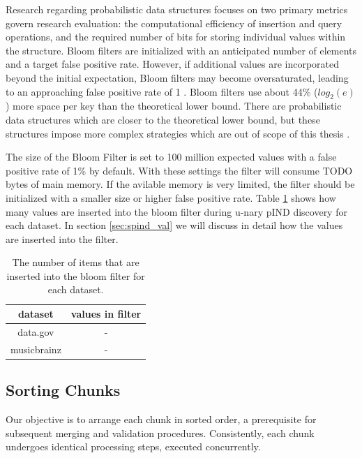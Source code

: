 Research regarding probabilistic data structures focuses on two primary metrics govern research evaluation: the computational efficiency of insertion and query operations, and the required number of bits for storing individual values within the structure\cite{fan2014cuckoo}. Bloom filters are initialized with an anticipated number of elements and a target false positive rate. However, if additional values are incorporated beyond the initial expectation, Bloom filters may become oversaturated, leading to an approaching false positive rate of 1 \cite{tarkoma2011theory}. Bloom filters use about 44\% ($log_2(e)$) more space per key than the theoretical lower bound. There are probabilistic data structures which are closer to the theoretical lower bound, but these structures impose more complex strategies which are out of scope of this thesis \cite{fan2014cuckoo}.

The size of the Bloom Filter is set to 100 million expected values with a false positive rate of 1\% by default. With these settings the filter will consume TODO bytes of main memory. If the avilable memory is very limited, the filter should be initialized with a smaller size or higher false positive rate. Table \ref{tab:filter} shows how many values are inserted into the bloom filter during u-nary pIND discovery for each dataset. In section \ref{sec:spind_val} we will discuss in detail how the values are inserted into the filter.

\begin{table}
    \begin{tabular}{c|c}
     dataset & values in filter\\ 
     \hline\hline
     data.gov & - \\ 
     \hline
     musicbrainz & - \\
    \end{tabular}
    \caption{The number of items that are inserted into the bloom filter for each dataset.} \label{tab:filter}
\end{table}


\subsection{Sorting Chunks}
Our objective is to arrange each chunk in sorted order, a prerequisite for subsequent merging and validation procedures. Consistently, each chunk undergoes identical processing steps, executed concurrently.

